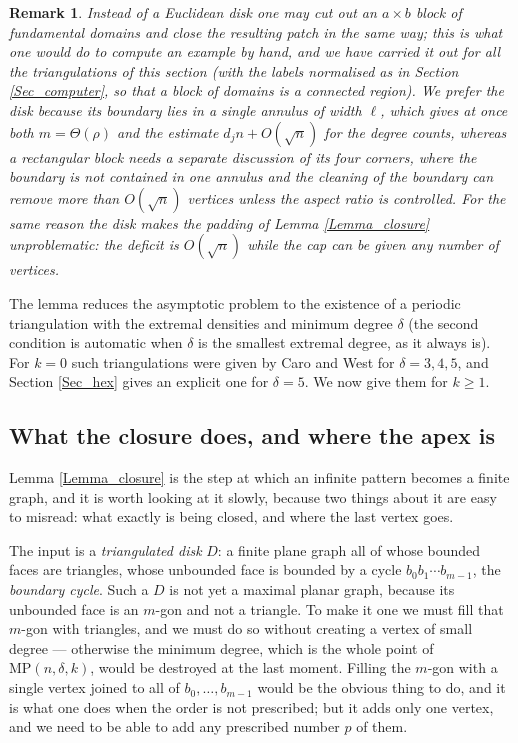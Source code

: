\documentclass[12pt,a4paper]{article}%
\newtheorem{remark}[theorem]{Remark}
\begin{document}
\begin{remark}
\label{Rem_patch}Instead of a Euclidean disk one may cut out an $a\times b$ block of fundamental domains and close the
resulting patch in the same way; this is what one would do to compute an example by hand, and we have carried it out
for all the triangulations of this section (with the labels normalised as in Section \ref{Sec_computer}, so that a block
of domains is a connected region). We prefer the disk because its boundary lies in a single annulus of width
$\ell $, which gives at once both $m=\Theta (\rho )$ and the estimate $d_{j}n+O(\sqrt{n})$ for the degree counts,
whereas a rectangular block needs a separate discussion of its four corners, where the boundary is not contained in
one annulus and the cleaning of the boundary can remove more than $O(\sqrt{n})$ vertices unless the aspect ratio is
controlled. For the same reason the disk makes the padding of Lemma \ref{Lemma_closure} unproblematic: the deficit is
$O(\sqrt{n})$ while the cap can be given any number of vertices.
\end{remark}

The lemma reduces the asymptotic problem to the existence of a periodic triangulation with the extremal densities
and minimum degree $\delta $ (the second condition is automatic when $\delta $ is the smallest extremal degree, as it
always is). For $k=0$ such triangulations were given by Caro and West \cite[Theorem 2.5]{CaroWest} for
$\delta =3,4,5$, and Section \ref{Sec_hex} gives an explicit one for $\delta =5$. We now give them for $k\geq 1$.

\subsection{What the closure does, and where the apex is}
\label{Sec_apex}

Lemma \ref{Lemma_closure} is the step at which an infinite pattern becomes a finite graph, and it is worth
looking at it slowly, because two things about it are easy to misread: what exactly is being closed, and where
the last vertex goes.

The input is a \emph{triangulated disk} $D$: a finite plane graph all of whose bounded faces are triangles,
whose unbounded face is bounded by a cycle $b_{0}b_{1}\cdots b_{m-1}$, the \emph{boundary cycle}. Such a $D$ is
not yet a maximal planar graph, because its unbounded face is an $m$-gon and not a triangle. To make it
one we must fill that $m$-gon with triangles, and we must do so without creating a vertex of small degree ---
otherwise the minimum degree, which is the whole point of $\mathrm{MP}(n,\delta ,k)$, would be destroyed at the
last moment. Filling the $m$-gon with a single vertex joined to all of $b_{0},\ldots ,b_{m-1}$ would be the
obvious thing to do, and it is what one does when the order is not prescribed; but it adds only one vertex, and
we need to be able to add any prescribed number $p$ of them.
\end{document}
